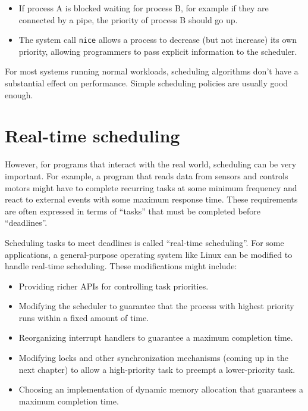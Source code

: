 \documentclass[12pt]{book}
\begin{document}
{\begin{itemize}
\item If process A is blocked waiting for process B, for example if
  they are connected by a pipe, the priority of process B should go
  up.

\item The system call {\tt nice} allows a process to decrease (but not
  increase) its own priority, allowing programmers to pass explicit
  information to the scheduler.

\end{itemize}

For most systems running normal workloads, scheduling algorithms
don't have a substantial effect on performance.  Simple scheduling
policies are usually good enough.


\section{Real-time scheduling}

However, for programs that interact with the real world, scheduling
can be very important.  For example, a program that reads data from
sensors and controls motors might have to complete recurring tasks at
some minimum frequency and react to external events with some maximum
response time.  These requirements are often expressed in terms of
``tasks'' that must be completed before ``deadlines''.

Scheduling tasks to meet deadlines is called ``real-time
  scheduling''.  For some applications, a general-purpose operating
system like Linux can be modified to handle real-time scheduling.
These modifications might include:

\begin{itemize}

\item Providing richer APIs for controlling task priorities.

\item Modifying the scheduler to guarantee that the process with
highest priority runs within a fixed amount of time.

\item Reorganizing interrupt handlers to guarantee
a maximum completion time.

\item Modifying locks and other synchronization mechanisms (coming up
  in the next chapter) to allow a high-priority task to preempt a
  lower-priority task.

\item Choosing an implementation of dynamic memory allocation that
guarantees a maximum completion time.


\end{itemize}}
\end{document}
